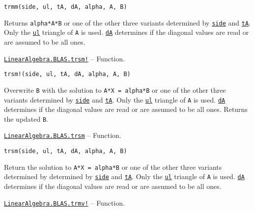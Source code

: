 \begin{adjustwidth}{2em}{0pt}


\begin{verbatim}
trmm(side, ul, tA, dA, alpha, A, B)
\end{verbatim}

Returns \texttt{alpha*A*B} or one of the other three variants determined by \hyperlink{3128026147631247774}{\texttt{side}} and \hyperlink{15951037910221396131}{\texttt{tA}}. Only the \hyperlink{13880289478825450693}{\texttt{ul}} triangle of \texttt{A} is used. \hyperlink{285101993251198425}{\texttt{dA}} determines if the diagonal values are read or are assumed to be all ones.



\end{adjustwidth}
\hypertarget{3732597007619096495}{} 
\hyperlink{3732597007619096495}{\texttt{LinearAlgebra.BLAS.trsm!}}  -- {Function.}

\begin{adjustwidth}{2em}{0pt}


\begin{verbatim}
trsm!(side, ul, tA, dA, alpha, A, B)
\end{verbatim}

Overwrite \texttt{B} with the solution to \texttt{A*X = alpha*B} or one of the other three variants determined by \hyperlink{3128026147631247774}{\texttt{side}} and \hyperlink{15951037910221396131}{\texttt{tA}}. Only the \hyperlink{13880289478825450693}{\texttt{ul}} triangle of \texttt{A} is used. \hyperlink{285101993251198425}{\texttt{dA}} determines if the diagonal values are read or are assumed to be all ones. Returns the updated \texttt{B}.



\end{adjustwidth}
\hypertarget{5446048787435487351}{} 
\hyperlink{5446048787435487351}{\texttt{LinearAlgebra.BLAS.trsm}}  -- {Function.}

\begin{adjustwidth}{2em}{0pt}


\begin{verbatim}
trsm(side, ul, tA, dA, alpha, A, B)
\end{verbatim}

Return the solution to \texttt{A*X = alpha*B} or one of the other three variants determined by determined by \hyperlink{3128026147631247774}{\texttt{side}} and \hyperlink{15951037910221396131}{\texttt{tA}}. Only the \hyperlink{13880289478825450693}{\texttt{ul}} triangle of \texttt{A} is used. \hyperlink{285101993251198425}{\texttt{dA}} determines if the diagonal values are read or are assumed to be all ones.



\end{adjustwidth}
\hypertarget{12526002304770163470}{} 
\hyperlink{12526002304770163470}{\texttt{LinearAlgebra.BLAS.trmv!}}  -- {Function.}

